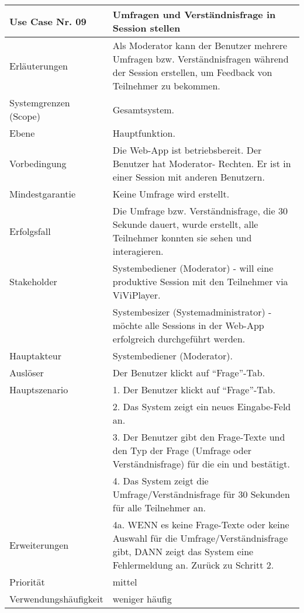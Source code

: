 \begin{tabularx}{\linewidth}{|l|X|}
	\hline
	Use Case Nr. 09			& \textbf{Umfragen und Verständnisfrage in Session stellen} \\ \hline
	Erläuterungen			& Als Moderator kann der Benutzer mehrere Umfragen bzw. Verständnisfragen
							  während der Session erstellen, um Feedback von Teilnehmer zu bekommen. \\ \hline
	Systemgrenzen (Scope)	& Gesamtsystem. \\ \hline
	Ebene					& Hauptfunktion. \\ \hline
	Vorbedingung			& Die Web-App ist betriebsbereit. Der Benutzer hat Moderator-
							  Rechten. Er ist in einer Session mit anderen Benutzern. \\ \hline
	Mindestgarantie			& Keine Umfrage wird erstellt. \\ \hline
	Erfolgsfall 			& Die Umfrage bzw. Verständnisfrage, die 30 Sekunde dauert, wurde erstellt,
							  alle Teilnehmer konnten sie sehen und interagieren. \\ \hline
	Stakeholder				& Systembediener (Moderator) - will eine produktive Session mit den 
							  Teilnehmer via ViViPlayer. \\
							& Systembesizer (Systemadministrator) - möchte alle Sessions in der 
							  Web-App erfolgreich durchgeführt werden. \\ \hline
	Hauptakteur				& Systembediener (Moderator). \\ \hline
	Auslöser				& Der Benutzer klickt auf ``Frage''-Tab. \\ \hline	
	Hauptszenario			& 1. Der Benutzer klickt auf ``Frage''-Tab. \\
							& 2. Das System zeigt ein neues Eingabe-Feld an. \\ 
							& 3. Der Benutzer gibt den Frage-Texte und den Typ der Frage (Umfrage
							  oder Verständnisfrage) für die ein und bestätigt. \\
							& 4. Das System zeigt die Umfrage/Verständnisfrage für 30 Sekunden für
							  alle Teilnehmer an. \\ \hline
	Erweiterungen			& 4a. WENN es keine Frage-Texte oder keine Auswahl für die 
							  Umfrage/Verständnisfrage gibt, DANN zeigt das System eine Fehlermeldung an. Zurück zu Schritt 2. \\ \hline
	Priorität				& mittel \\ \hline
	Verwendungshäufigkeit	& weniger häufig \\ \hline
\end{tabularx}